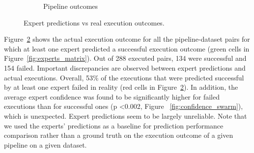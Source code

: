 \begin{figure}
\begin{subfigure}{.60\textwidth}
  \caption{Pipeline outcomes}
  \label{fig:execution_matrix}
\end{subfigure}
\caption{Expert predictions vs real execution outcomes.}
\end{figure}



Figure~\ref{fig:execution_matrix} shows the actual execution outcome for
all the pipeline-dataset pairs for which at least one expert predicted a
successful execution outcome (green cells in
Figure~\ref{fig:experts_matrix}). Out of 288 executed pairs, 134   were
successful and 154 failed. 
Important discrepancies are observed between expert predictions and actual
executions. Overall, 53\% of the executions that were predicted successful by
at least one expert failed in reality (red cells in
Figure~\ref{fig:execution_matrix}). In addition, the average expert
confidence was found to be significantly higher for failed executions than
for successful ones (p \textless 0.002, Figure
~\ref{fig:confidence_swarm}), which is unexpected. Expert predictions
seem to be largely unreliable. Note that we used the experts' predictions as a baseline for prediction performance comparison rather than a ground truth on the execution outcome of a given pipeline on a given dataset. 

